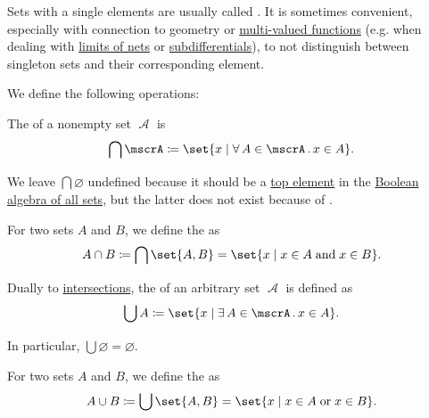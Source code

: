 \begin{remark}\label{rem:singleton_sets}
  Sets with a single elements are usually called . It is sometimes convenient, especially with connection to geometry or \hyperref[def:multi_valued_function]{multi-valued functions} (e.g. when dealing with \hyperref[def:net_convergence/limit]{limits of nets} or \hyperref[def:subdifferentials]{subdifferentials}), to not distinguish between singleton sets and their corresponding element.
\end{remark}

\begin{definition}\label{def:basic_set_operations}
  We define the following operations:

  \begin{thmenum}
     The  of a nonempty set \( \mscrA \) is
    \begin{equation*}
      \bigcap \mscrA \coloneqq \set{ x \given \qforall {A \in \mscrA} x \in A }.
    \end{equation*}

    We leave \( \bigcap \varnothing \) undefined because it should be a \hyperref[def:poset_extremal_points/top_and_bottom]{top element} in the \hyperref[thm:boolean_algebra_of_subsets]{Boolean algebra of all sets}, but the latter does not exist because of .

    For two sets \( A \) and \( B \), we define the  as
    \begin{equation*}
      A \cap B \coloneqq \bigcap \set{ A, B } = \set{ x \given x \in A \T{and} x \in B }.
    \end{equation*}

     Dually to \hyperref[def:basic_set_operations/intersection]{intersections}, the  of an arbitrary set \( \mscrA \) is defined as
    \begin{equation*}
      \bigcup A \coloneqq \set{ x \given \qexists {A \in \mscrA} x \in A }.
    \end{equation*}

    In particular, \( \bigcup \varnothing = \varnothing \).

    For two sets \( A \) and \( B \), we define the  as
    \begin{equation*}
      A \cup B \coloneqq \bigcup \set{ A, B } = \set{ x \given x \in A \T{or} x \in B }.
    \end{equation*}


\end{thmenum}
\end{definition}
